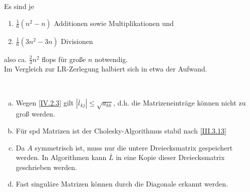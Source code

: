 Es sind je 
\begin{enumerate}
	\item[] $\frac{1}{6}(n^2-n) $ Additionen sowie Multiplikationen und 
	\item[]  $\frac{1}{6}(3n^2-3n) $ Divisionen 
\end{enumerate}
also ca. $\frac{2}{3} n^2$ flops für große $n$ notwendig. \\
Im Vergleich zur LR-Zerlegung halbiert sich in etwa der Aufwand.

\begin{Beme}~
	\begin{enumerate}[a)]
		\item Wegen \eqref{IV.2.3} gilt $|\overline{l}_{kj}| \leq \sqrt{a_{kk}}$,
		d.h. die Matrizeneinträge können nicht zu groß werden.
		\item Für spd Matrizen ist der Cholesky-Algorithmus stabil nach \eqref{III.3.13}
		\item Da $A$ symmetrisch ist, muss nur die untere Dreiecksmatrix gespeichert werden.
		In Algorithmen kann $\bar{L}$ in eine Kopie dieser Dreiecksmatrix geschrieben werden.
		\item Fast singuläre Matrizen können durch die Diagonale erkannt werden.
	\end{enumerate}
\end{Beme}


 

